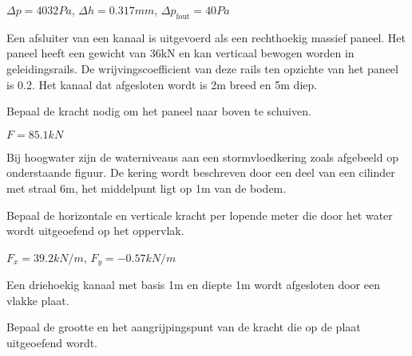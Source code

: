 	\begin{antwoord}
		$\Delta p = \unit{4032}{Pa}$, $\Delta h = \unit{0.317}{mm}$, $\Delta p_{\text{fout}} = \unit{40}{Pa}$
	\end{antwoord}
	\begin{toepassing}
		\label{wrijvingskracht}
Een afsluiter van een kanaal is uitgevoerd als een rechthoekig massief paneel. Het paneel heeft een gewicht van \unit{36}{kN} en kan verticaal bewogen worden in geleidingsrails. De wrijvingscoefficient van deze rails ten opzichte van het paneel is 0.2. Het kanaal dat afgesloten wordt is 2m breed en 5m diep.
		
Bepaal de kracht nodig om het paneel naar boven te schuiven.
		\begin{center}
		\end{center}
	\end{toepassing}
	\begin{antwoord}
		$F = \unit{85.1}{kN}$
	\end{antwoord}
	\begin{toepassing}
		\label{stormvloedkering}
Bij hoogwater zijn de waterniveaus aan een stormvloedkering zoals afgebeeld op onderstaande figuur. De kering wordt beschreven door een deel van een cilinder met straal \unit{6}{m}, het middelpunt ligt op \unit{1}{m} van de bodem.
		
Bepaal de horizontale en verticale kracht per lopende meter die door het water wordt uitgeoefend op het oppervlak.
		\begin{center}
			
		\end{center}
	\end{toepassing}
	\begin{antwoord}
		$F_x = \unit{39.2}{kN/m}$, $F_y = \unit{-0.57}{kN/m}$
	\end{antwoord}
	\begin{toepassing}
		\label{driehoekig_kanaal}
Een driehoekig kanaal met basis 1m en diepte 1m wordt afgesloten door een vlakke plaat.
		
Bepaal de grootte en het aangrijpingspunt van de kracht die op de plaat uitgeoefend wordt.
		\begin{center}
			
		\end{center}
	\end{toepassing}
